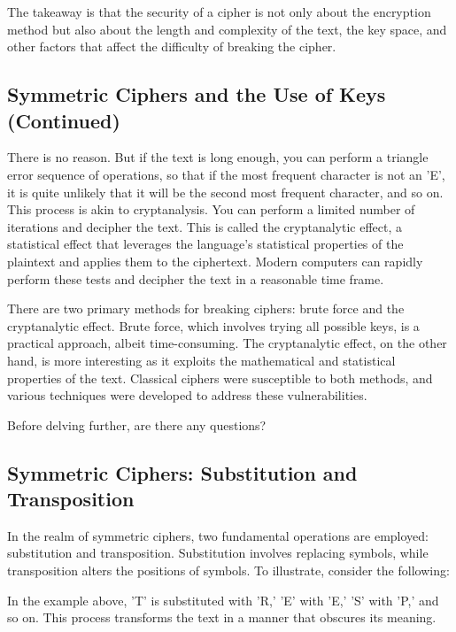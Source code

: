 \documentclass{class}
\begin{document}
The takeaway is that the security of a cipher is not only about the encryption method but also about the length and complexity of the text, the key space, and other factors that affect the difficulty of breaking the cipher.

\subsection{Symmetric Ciphers and the Use of Keys (Continued)}

There is no reason.
But if the text is long enough, you can perform a triangle error sequence of operations, so that if the most frequent character is not an 'E', it is quite unlikely that it will be the second most frequent character, and so on. This process is akin to cryptanalysis. You can perform a limited number of iterations and decipher the text. This is called the cryptanalytic effect, a statistical effect that leverages the language's statistical properties of the plaintext and applies them to the ciphertext. Modern computers can rapidly perform these tests and decipher the text in a reasonable time frame.

There are two primary methods for breaking ciphers: brute force and the cryptanalytic effect. Brute force, which involves trying all possible keys, is a practical approach, albeit time-consuming. The cryptanalytic effect, on the other hand, is more interesting as it exploits the mathematical and statistical properties of the text. Classical ciphers were susceptible to both methods, and various techniques were developed to address these vulnerabilities.

Before delving further, are there any questions?

\subsection{Symmetric Ciphers: Substitution and Transposition}

In the realm of symmetric ciphers, two fundamental operations are employed: substitution and transposition. Substitution involves replacing symbols, while transposition alters the positions of symbols. To illustrate, consider the following:




In the example above, 'T' is substituted with 'R,' 'E' with 'E,' 'S' with 'P,' and so on. This process transforms the text in a manner that obscures its meaning.
\end{document}
